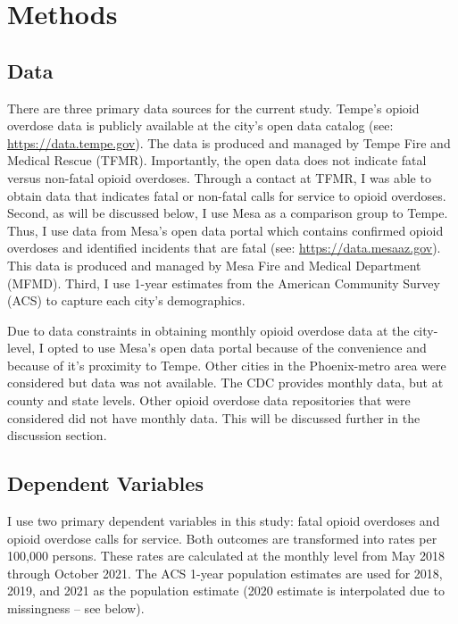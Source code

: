 \section{\centering Methods}
\subsection{Data}
There are three primary data sources for the current study. Tempe's opioid overdose data is publicly available at the city's open data catalog (see: \href{https://data.tempe.gov/datasets/2daeeafd2741494c8294ca415e5a793e_0/explore?location=33.398962%2C-111.931850%2C11.93}{https://data.tempe.gov}). The data is produced and managed by Tempe Fire and Medical Rescue (TFMR). Importantly, the open data does not indicate fatal versus non-fatal opioid overdoses. Through a contact at TFMR, I was able to obtain data that indicates fatal or non-fatal calls for service to opioid overdoses. 
Second, as will be discussed below, I use Mesa as a comparison group to Tempe. Thus, I use data from Mesa's open data portal which contains confirmed opioid overdoses and identified incidents that are fatal (see: \href{https://data.mesaaz.gov/Fire-and-Medical/Fire-and-Medical-Opioid-Overdose-Incidents/qufy-tzv6/about_data}{https://data.mesaaz.gov}). This data is produced and managed by Mesa Fire and Medical Department (MFMD). Third, I use 1-year estimates from the American Community Survey (ACS) to capture each city's demographics.

Due to data constraints in obtaining monthly opioid overdose data at the city-level, I opted to use Mesa's open data portal because of the convenience and because of it's proximity to Tempe. Other cities in the Phoenix-metro area were considered but data was not available. The CDC provides monthly data, but at county and state levels. Other opioid overdose data repositories that were considered did not have monthly data. This will be discussed further in the discussion section.

\subsection{Dependent Variables}
I use two primary dependent variables in this study: fatal opioid overdoses and opioid overdose calls for service. Both outcomes are transformed into rates per 100,000 persons. These rates are calculated at the monthly level from May 2018 through October 2021. The ACS 1-year population estimates are used for 2018, 2019, and 2021 as the population estimate (2020 estimate is interpolated due to missingness -- see below).


